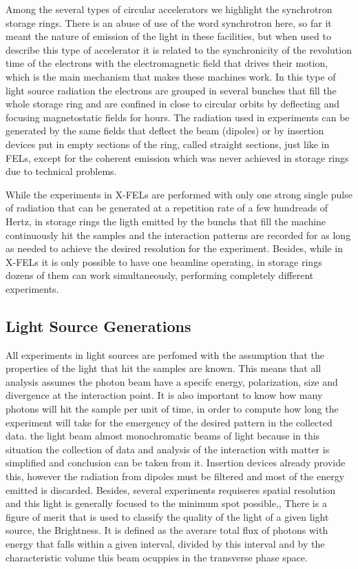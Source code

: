\documentclass[
	12pt,				%
	openright,			%
	oneside,			%
	a4paper,		%
	chapter=TITLE,		%
	section=TITLE,		%
    brazil,				%
	english,			%
	sumario=tradicional,
	]{abntex2}
\begin{document}
    Among the several types of circular accelerators we highlight the synchrotron storage rings. There is an abuse of use of the word synchrotron here, so far it meant the nature of emission of the light in these facilities, but when used to describe this type of accelerator it is related to the synchronicity of the revolution time of the electrons with the electromagnetic field that drives their motion, which is the main mechanism that makes these machines work. In this type of light source radiation the electrons are grouped in several bunches that fill the whole storage ring and are confined in close to circular orbits by deflecting and focusing magnetostatic fields for hours. The radiation used in experiments can be generated by the same fields that deflect the beam (dipoles) or by insertion devices put in empty sections of the ring, called straight sections, just like in FELs, except for the coherent emission which was never achieved in storage rings due to technical problems.

    While the experiments in X-FELs are performed with only one strong single pulse of radiation that can be generated at a repetition rate of a few hundreads of Hertz, in storage rings the ligth emitted by the bunchs that fill the machine continuously hit the samples and the interaction patterns are recorded for as long as needed to achieve the desired resolution for the experiment. Besides, while in X-FELs it is only possible to have one beamline operating, in storage rings dozens of them can work simultaneously, performing completely different experiments.


    \subsection{Light Source Generations}

    All experiments in light sources are perfomed with the assumption that the properties of the light that hit the samples are known. This means that all analysis assumes the photon beam have a specifc energy, polarization, size and divergence at the interaction point. It is also important to know how many photons will hit the sample per unit of time, in order to compute how long the experiment will take for the emergency of the desired pattern in the collected data. the light beam  almost monochromatic beams of light because in this situation the collection of data and analysis of the interaction with matter is simplified and conclusion can be taken from it. Insertion devices already provide this, however the radiation from dipoles must be filtered and most of the energy emitted is discarded. Besides, several experiments requiseres spatial resolution and this light is generally focused to the minimum spot possible,,   There is a figure of merit that is used to classify the quality of the light of a given light source, the Brightness. It is defined as the averare total flux of photons with energy that falls within a given interval, divided by this interval and by the characteristic volume this beam ocuppies in the transverse phase space.
\end{document}
